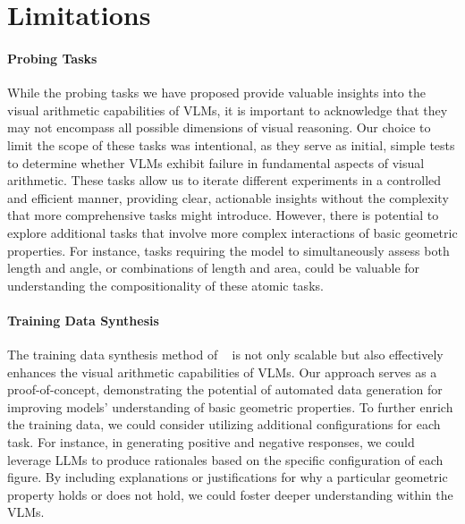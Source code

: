 \section{Limitations}


\paragraph{Probing Tasks} While the probing tasks we have proposed provide valuable insights into the visual arithmetic capabilities of VLMs, it is important to acknowledge that they may not encompass all possible dimensions of visual reasoning. Our choice to limit the scope of these tasks was intentional, as they serve as initial, simple tests to determine whether VLMs exhibit failure in fundamental aspects of visual arithmetic. These tasks allow us to iterate different experiments in a controlled and efficient manner, providing clear, actionable insights without the complexity that more comprehensive tasks might introduce. However, there is potential to explore additional tasks that involve more complex interactions of basic geometric properties. For instance, tasks requiring the model to simultaneously assess both length and angle, or combinations of length and area, could be valuable for understanding the compositionality of these atomic tasks. 

\paragraph{Training Data Synthesis}The training data synthesis method of \method~ is not only scalable but also effectively enhances the visual arithmetic capabilities of VLMs. Our approach serves as a proof-of-concept, demonstrating the potential of automated data generation for improving models' understanding of basic geometric properties. To further enrich the training data, we could consider utilizing additional configurations for each task. For instance, in generating positive and negative responses, we could leverage LLMs to produce rationales based on the specific configuration of each figure. By including explanations or justifications for why a particular geometric property holds or does not hold, we could foster deeper understanding within the VLMs. 

